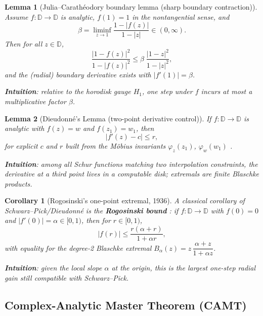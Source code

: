 \documentclass[11pt]{article}
\newtheorem{lemma}{Lemma}
\newtheorem{corollary}{Corollary}
\begin{document}
\begin{lemma}[Julia–Carathéodory boundary lemma (sharp boundary contraction)]
Assume $f:\mathbb{D}\to\mathbb{D}$ is analytic, $f(1)=1$ in the nontangential sense, and
\begin{equation}
\beta = \liminf_{z\to 1}\frac{1-|f(z)|}{1-|z|}\in(0,\infty).
\end{equation}
Then for all $z\in\mathbb{D}$,
\begin{equation}
\frac{|1-f(z)|^2}{1-|f(z)|^2} \leq \beta\;\frac{|1-z|^2}{1-|z|^2},
\end{equation}
and the (radial) boundary derivative exists with $|f'(1)|=\beta$. 

\textbf{Intuition}: relative to the horodisk gauge $H_1$, one step under $f$ incurs at most a multiplicative factor $\beta$.
\end{lemma}

\begin{lemma}[Dieudonné's Lemma (two-point derivative control)]
If $f:\mathbb{D}\to\mathbb{D}$ is analytic with $f(z)=w$ and $f(z_1)=w_1$, then
\begin{equation}
|f'(z)-c| \leq r,
\end{equation}
for explicit $c$ and $r$ built from the Möbius invariants $\varphi_{z}(z_1)$, $\varphi_{w}(w_1)$ \cite{dieudonne1934,mercer2018}. 

\textbf{Intuition}: among all Schur functions matching two interpolation constraints, the derivative at a third point lives in a computable disk; extremals are finite Blaschke products.
\end{lemma}

\begin{corollary}[Rogosinski's one-point extremal, 1936]
A classical corollary of Schwarz–Pick/Dieudonné is the \textbf{Rogosinski bound} \cite{rogosinski1936}: if $f:\mathbb{D}\to\mathbb{D}$ with $f(0)=0$ and $|f'(0)|=\alpha\in[0,1)$, then for $r\in[0,1)$,
\begin{equation}
|f(r)| \leq \frac{r(\alpha+r)}{1+\alpha r},
\end{equation}
with equality for the degree-2 Blaschke extremal $B_{\alpha}(z)=z\,\dfrac{\alpha+z}{1+\alpha z}$. 

\textbf{Intuition}: given the local slope $\alpha$ at the origin, this is the largest one-step radial gain still compatible with Schwarz–Pick.
\end{corollary}

\subsection{Complex-Analytic Master Theorem (CAMT)}
\end{document}

